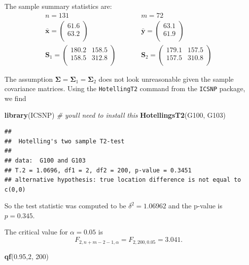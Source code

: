 \documentclass[
]{book}
\newenvironment{Shaded}{\begin{snugshade}}{\end{snugshade}}
\newcommand{\CommentTok}[1]{\textcolor[rgb]{0.56,0.35,0.01}{\textit{#1}}}
\newcommand{\DecValTok}[1]{\textcolor[rgb]{0.00,0.00,0.81}{#1}}
\newcommand{\FloatTok}[1]{\textcolor[rgb]{0.00,0.00,0.81}{#1}}
\newcommand{\FunctionTok}[1]{\textcolor[rgb]{0.13,0.29,0.53}{\textbf{#1}}}
\newcommand{\NormalTok}[1]{#1}
\theoremstyle{definition}
\theoremstyle{definition}
\theoremstyle{definition}
\theoremstyle{definition}
\theoremstyle{remark}
\begin{document}
The sample summary statistics are:
\begin{eqnarray*}
n = 131 &\quad& m = 72 \\
\bar{\mathbf x} = \begin{pmatrix}61.6 \\63.2 \\\end{pmatrix}&\quad& \bar{\mathbf y}= \begin{pmatrix}63.1 \\61.9 \\\end{pmatrix}\\
\mathbf S_1 = \begin{pmatrix}180.2&158.5 \\158.5&312.8 \\\end{pmatrix} &\qquad& \mathbf S_2 = \begin{pmatrix}179.1&157.5 \\157.5&310.8 \\\end{pmatrix}
\end{eqnarray*}

The assumption \(\boldsymbol{\Sigma}= \boldsymbol{\Sigma}_1 = \boldsymbol{\Sigma}_2\) does not look unreasonable given the sample covariance matrices. Using the \texttt{HotellingT2} command from the \texttt{ICSNP} package, we find

\begin{Shaded}
\begin{Highlighting}[]
\FunctionTok{library}\NormalTok{(ICSNP) }\CommentTok{\# you\textquotesingle{}ll need to install this}
\FunctionTok{HotellingsT2}\NormalTok{(G100, G103)}
\end{Highlighting}
\end{Shaded}

\begin{verbatim}
## 
##  Hotelling's two sample T2-test
## 
## data:  G100 and G103
## T.2 = 1.0696, df1 = 2, df2 = 200, p-value = 0.3451
## alternative hypothesis: true location difference is not equal to c(0,0)
\end{verbatim}

So the test statistic was computed to be \(\delta^2 = 1.06962\) and the p-value is \(p= 0.345\).

The critical value for \(\alpha=0.05\) is
\[F_{2,n+m-2-1,\alpha} = F_{2,200,0.05} = 3.041.\]

\begin{Shaded}
\begin{Highlighting}[]
\FunctionTok{qf}\NormalTok{(}\FloatTok{0.95}\NormalTok{,}\DecValTok{2}\NormalTok{, }\DecValTok{200}\NormalTok{)}
\end{Highlighting}
\end{Shaded}
\end{document}
